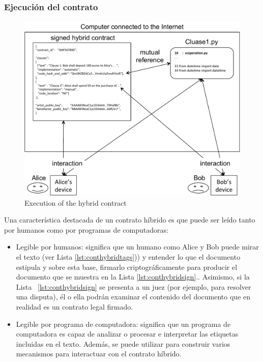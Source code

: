 \documentclass[12pt]{report} %
\begin{document}
 


\subsubsection{Ejecución del contrato}

\begin{figure}
\centering
\includegraphics[width=0.98\columnwidth]{figures/execonthybrid.pdf}
\caption{Execution of the hybrid contract} 
\label{fig:execonthybrid}
\end{figure}
 


Una característica destacada de un contrato híbrido es que puede ser leído tanto por humanos como por programas de computadoras:

\begin{itemize}
    \item Legible por humanos: significa que un humano como Alice y Bob puede mirar el texto (ver Lista \ref{lst:conthybridtags})) y entender lo que el documento estipula y sobre esta base, firmarlo criptográficamente para producir el documento que se muestra en la Lista \ref{lst:conthybridsign}.. Asimismo, si la Lista ~\ref{lst:conthybridsign} se presenta a un juez (por ejemplo, para resolver una disputa), él o ella podrán examinar el contenido del documento que en realidad es un contrato legal firmado.
    \item Legible por programa de computadora: significa que un programa de computadora es capaz de analizar o procesar e interpretar las etiquetas incluidas en el texto. Además, se puede utilizar para construir varios mecanismos para interactuar con el contrato híbrido. 

    
\end{itemize}
\end{document}
